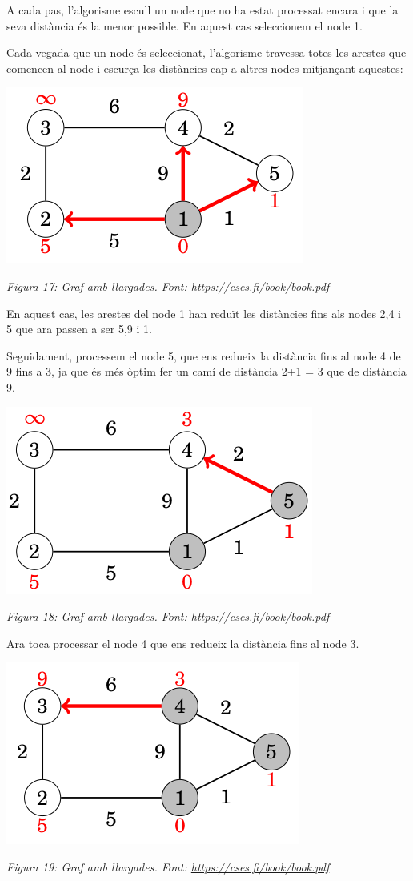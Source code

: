 A cada pas, l'algorisme escull un node que no ha estat processat encara i que la seva distància és la menor possible. En aquest cas seleccionem el node 1.

Cada vegada que un node és seleccionat, l'algorisme travessa totes les arestes que comencen al node i escurça les distàncies cap a altres nodes mitjançant aquestes:

\begin{center}
    \includegraphics[width=.5 \textwidth]{grafDij2.png}
    
    \caption{\emph{Figura 17: Graf amb llargades. Font: \url{https://cses.fi/book/book.pdf}}}
\end{center}

En aquest cas, les arestes del node 1 han reduït les distàncies fins als nodes 2,4 i 5 que ara passen a ser 5,9 i 1.

Seguidament, processem el node 5, que ens redueix la distància fins al node 4 de 9 fins a 3, ja que és més òptim fer un camí de distància 2+1 = 3 que de distància 9.

\begin{center}
    \includegraphics[width=.5 \textwidth]{grafDij3.png}
    
    \caption{\emph{Figura 18: Graf amb llargades. Font: \url{https://cses.fi/book/book.pdf}}}
\end{center}

Ara toca processar el node 4 que ens redueix la distància fins al node 3.

\begin{center}
    \includegraphics[width=.5 \textwidth]{grafDij4.png}
    
    \caption{\emph{Figura 19: Graf amb llargades. Font: \url{https://cses.fi/book/book.pdf}}}
\end{center}


